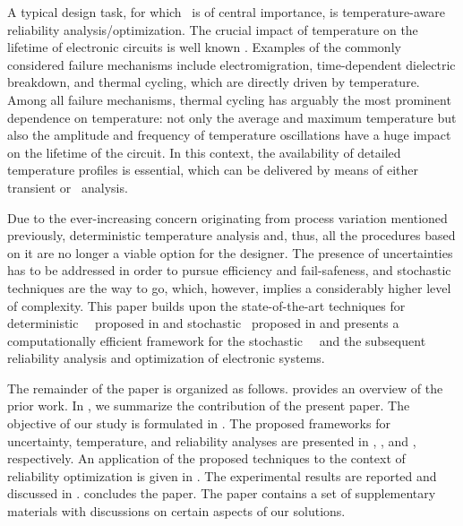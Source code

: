 A typical design task, for which \ta\ is of central importance, is temperature-aware reliability analysis/optimization.
The crucial impact of temperature on the lifetime of electronic circuits is well known \cite{jedec, das2014}.
Examples of the commonly considered failure mechanisms include electromigration, time-dependent dielectric breakdown, and thermal cycling, which are directly driven by temperature.
Among all failure mechanisms, thermal cycling has arguably the most prominent dependence on temperature: not only the average and maximum temperature but also the amplitude and frequency of temperature oscillations have a huge impact on the lifetime of the circuit.
In this context, the availability of detailed temperature profiles is essential, which can be delivered by means of either transient or \DSS\ analysis.

Due to the ever-increasing concern originating from process variation mentioned previously, deterministic temperature analysis and, thus, all the procedures based on it are no longer a viable option for the designer.
The presence of uncertainties has to be addressed in order to pursue efficiency and fail-safeness, and stochastic techniques are the way to go, which, however, implies a considerably higher level of complexity.
This paper builds upon the state-of-the-art techniques for deterministic \DSS\ \ta\ proposed in \cite{ukhov2012} and stochastic \tta\ proposed in \cite{ukhov2014} and presents a computationally efficient framework for the stochastic \DSS\ \ta\ and the subsequent reliability analysis and optimization of electronic systems.

The remainder of the paper is organized as follows.
 provides an overview of the prior work.
In , we summarize the contribution of the present paper.
The objective of our study is formulated in .
The proposed frameworks for uncertainty, temperature, and reliability analyses are presented in , , and , respectively.
An application of the proposed techniques to the context of reliability optimization is given in .
The experimental results are reported and discussed in .
 concludes the paper.
The paper contains a set of supplementary materials with discussions on certain aspects of our solutions.

